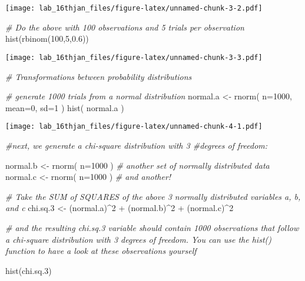 \documentclass[
]{article}
\newenvironment{Shaded}{\begin{snugshade}}{\end{snugshade}}
\newcommand{\AttributeTok}[1]{\textcolor[rgb]{0.77,0.63,0.00}{#1}}
\newcommand{\CommentTok}[1]{\textcolor[rgb]{0.56,0.35,0.01}{\textit{#1}}}
\newcommand{\DecValTok}[1]{\textcolor[rgb]{0.00,0.00,0.81}{#1}}
\newcommand{\FloatTok}[1]{\textcolor[rgb]{0.00,0.00,0.81}{#1}}
\newcommand{\FunctionTok}[1]{\textcolor[rgb]{0.00,0.00,0.00}{#1}}
\newcommand{\NormalTok}[1]{#1}
\newcommand{\OtherTok}[1]{\textcolor[rgb]{0.56,0.35,0.01}{#1}}
\newcommand{\SpecialCharTok}[1]{\textcolor[rgb]{0.00,0.00,0.00}{#1}}
\begin{document}
\texttt{[image: lab\_16thjan\_files/figure-latex/unnamed-chunk-3-2.pdf]}

\begin{Shaded}
\begin{Highlighting}[]
\CommentTok{\# Do the above with 100 observations and 5 trials per observation}
\FunctionTok{hist}\NormalTok{(}\FunctionTok{rbinom}\NormalTok{(}\DecValTok{100}\NormalTok{,}\DecValTok{5}\NormalTok{,}\FloatTok{0.6}\NormalTok{))}
\end{Highlighting}
\end{Shaded}

\texttt{[image: lab\_16thjan\_files/figure-latex/unnamed-chunk-3-3.pdf]}

\begin{Shaded}
\begin{Highlighting}[]
\CommentTok{\# Transformations between probability distributions}

\CommentTok{\# generate 1000 trials from a normal distribution}
\NormalTok{normal.a }\OtherTok{\textless{}{-}} \FunctionTok{rnorm}\NormalTok{( }\AttributeTok{n=}\DecValTok{1000}\NormalTok{, }\AttributeTok{mean=}\DecValTok{0}\NormalTok{, }\AttributeTok{sd=}\DecValTok{1}\NormalTok{ ) }
\FunctionTok{hist}\NormalTok{( normal.a )}
\end{Highlighting}
\end{Shaded}

\texttt{[image: lab\_16thjan\_files/figure-latex/unnamed-chunk-4-1.pdf]}

\begin{Shaded}
\begin{Highlighting}[]
\CommentTok{\#next, we generate a chi{-}square distribution with 3 \#degrees of freedom:}

\NormalTok{normal.b }\OtherTok{\textless{}{-}} \FunctionTok{rnorm}\NormalTok{( }\AttributeTok{n=}\DecValTok{1000}\NormalTok{ )  }\CommentTok{\# another set of normally distributed data}
\NormalTok{normal.c }\OtherTok{\textless{}{-}} \FunctionTok{rnorm}\NormalTok{( }\AttributeTok{n=}\DecValTok{1000}\NormalTok{ )  }\CommentTok{\# and another!}

\CommentTok{\# Take the SUM of SQUARES of the above 3 normally distributed variables a, b, and c}
\NormalTok{chi.sq}\FloatTok{.3} \OtherTok{\textless{}{-}}\NormalTok{ (normal.a)}\SpecialCharTok{\^{}}\DecValTok{2} \SpecialCharTok{+}\NormalTok{ (normal.b)}\SpecialCharTok{\^{}}\DecValTok{2} \SpecialCharTok{+}\NormalTok{ (normal.c)}\SpecialCharTok{\^{}}\DecValTok{2} 

\CommentTok{\# and the resulting chi.sq.3 variable should contain 1000 observations that follow a chi{-}square distribution with 3 degrees of freedom. You can use the hist() function to have a look at these observations yourself}

\FunctionTok{hist}\NormalTok{(chi.sq}\FloatTok{.3}\NormalTok{)}
\end{Highlighting}
\end{Shaded}
\end{document}
